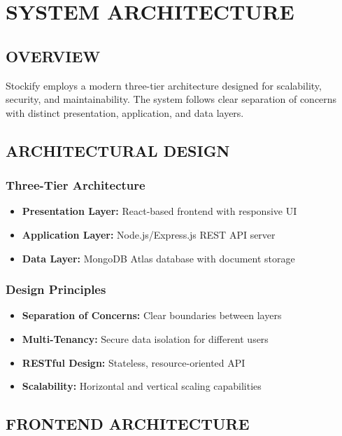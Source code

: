 \chapter{SYSTEM ARCHITECTURE}

\section{OVERVIEW}

Stockify employs a modern three-tier architecture designed for scalability, security, and maintainability. The system follows clear separation of concerns with distinct presentation, application, and data layers.

\section{ARCHITECTURAL DESIGN}

\subsection{Three-Tier Architecture}
\begin{itemize}
    \item \textbf{Presentation Layer:} React-based frontend with responsive UI
    \item \textbf{Application Layer:} Node.js/Express.js REST API server  
    \item \textbf{Data Layer:} MongoDB Atlas database with document storage
\end{itemize}

\subsection{Design Principles}
\begin{itemize}
    \item \textbf{Separation of Concerns:} Clear boundaries between layers
    \item \textbf{Multi-Tenancy:} Secure data isolation for different users
    \item \textbf{RESTful Design:} Stateless, resource-oriented API
    \item \textbf{Scalability:} Horizontal and vertical scaling capabilities
\end{itemize}

\section{FRONTEND ARCHITECTURE}

